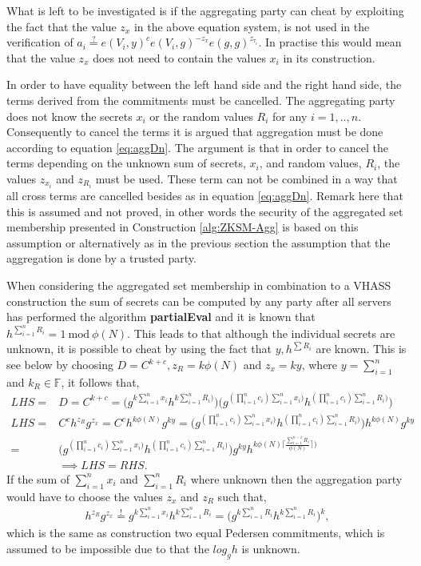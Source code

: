 What is left to be investigated is if the aggregating party can cheat by exploiting the fact that the value $z_x$ in the above equation system, is not used in the verification of $a_i\overset{?}{=} e(V_i,y)^ce(V_i,g)^{-z_x}e(g,g)^{z_{\tau_i}}$. In practise this would mean that the value $z_x$ does not need to contain the values $x_i$ in its construction. 

In order to have equality between the left hand side and the right hand side, the terms derived from the commitments must be cancelled. The aggregating party does not know the secrets $x_i$ or the random values $R_i$ for any $i=1,..,n$. Consequently to cancel the terms it is argued  that aggregation must be done according to equation \eqref{eq:aggDn}. The argument is that in order to cancel the terms depending on the unknown sum of secrets, $x_i$, and random values, $R_i$, the values $z_{x_i}$ and $z_{R_i}$ must be used. These term can not be combined in a way that all cross terms are cancelled besides as in equation \ref{eq:aggDn}. Remark here that this is assumed and not proved, in other words the security of the aggregated set membership presented in Construction \ref{alg:ZKSM-Agg} is based on this assumption or alternatively as in the previous section the assumption that the aggregation is done by a trusted party.

When considering the aggregated set membership in combination to a VHASS construction the sum of secrets can be computed by any party after all servers has performed the algorithm \textbf{partialEval} and it is known that $h^{\sum_{i=1}^n R_i } =1 \: \text{mod}\:  \phi(N)$. This leads to that although the individual secrets are unknown, it is possible to cheat by using the fact that $y, h^{\sum{R_i}}$ are known. This is see below by choosing $D=C^{k+c}, z_R = k\phi (N)$ and $z_x = k y$, where $y= \sum_{i=1}^n$ and $k_R\in \mathds{F}$, it follows that, 
\begin{align*}
LHS =& D = C^{k+c}= \big( g^ { k \sum_{i=1}^n x_i } h^{ k  \sum_{i=1}^n R_i ) } \big)   \big( g^{ (  \prod_{i=1}^n c_i ) \sum_{i=1}^n x_i ) } h^{ ( \prod_{i=1}^n c_i ) \sum_{i=1}^n R_i ) } \big)   \\
LHS =& C^c h^{z_R}g^{z_x} = C^c h^{k \phi (N) } g^{k y} =  \big( g^{ (  \prod_{i=1}^n c_i ) \sum_{i=1}^n x_i ) } h^{ ( \prod_{i=1}^n c_i ) \sum_{i=1}^n R_i ) } \big) h^{k\phi (N)} g^{ky}\\
= &  \big( g^{ (  \prod_{i=1}^n c_i ) \sum_{i=1}^n x_i ) } h^{ ( \prod_{i=1}^n c_i ) \sum_{i=1}^n R_i ) } \big)g^ { k y} h^{ k  \phi(N)\lceil \frac{\sum_{i=1}^{n-1}R_i}{\phi(N)}\rceil ) }\\
& \implies LHS= RHS.
\end{align*}
If the sum of $\sum_{i=1}^n x_i$ and $\sum_{i=1}^nR_i$ where unknown then the aggregation party would have to choose the values $z_x$ and $z_R$ such that,
\begin{align*}
h^{z_R}g^{z_x} \overset{!}{=} g^{k\sum_{i=1}^n x_i }h^{k\sum_{i=1}^n R_i } = \Big( g^{k\sum_{i=1}^n R_i}h^{k\sum_{i=1}^n R_i}\Big)^k,
\end{align*}
which is the same as construction two equal Pedersen commitments, which is assumed to be impossible due to that the $log_g h$ is unknown. 

